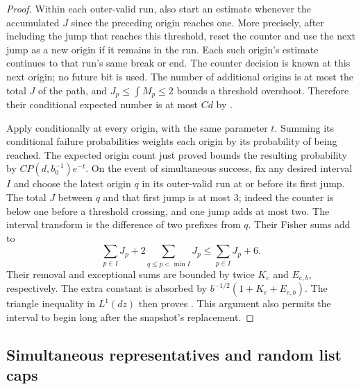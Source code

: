\begin{proof}
Within each outer-valid run, also start an estimate whenever the
accumulated $J$ since the preceding origin reaches one.  More precisely,
after including the jump that reaches this threshold, reset the counter
and use the next jump as a new origin if it remains in the run.  Each
such origin's estimate continues to that run's same break or end.  The
counter decision is known at this next origin; no future bit is used.
The number of additional origins is at most the total $J$ of the path,
and $J_p\le\int M_p\le2$ bounds a threshold overshoot.  Therefore their
conditional expected number is at most $Cd$ by
.

Apply  conditionally at every origin, with the
same parameter $t$.  Summing its conditional failure probabilities
weights each origin by its probability of being reached.  The expected
origin count just proved bounds the resulting probability by
$C P(d,b_0^{-1})e^{-t}$.
On the event of simultaneous success, fix any desired interval $I$ and
choose the latest origin $q$ in its outer-valid run at or before its first
jump.  The total $J$ between $q$ and that first jump is at most $3$;
indeed the counter is below one before a threshold crossing, and one
jump adds at most two.  The interval transform is the difference of
two prefixes from $q$.  Their Fisher sums add to
\[
 \sum_{p\in I}J_p+2\sum_{q\le p<\min I}J_p
 \le\sum_{p\in I}J_p+6.
\]
Their removal and exceptional sums are bounded by twice $K_e$ and
$E_{e,b}$, respectively.  The extra constant is absorbed by
$b^{-1/2}(1+K_e+E_{e,b})$.  The triangle inequality in $L^1(dz)$ then
proves .  This argument also permits the
interval to begin long after the snapshot's replacement.
\end{proof}

\subsection{Simultaneous representatives and random list caps}

